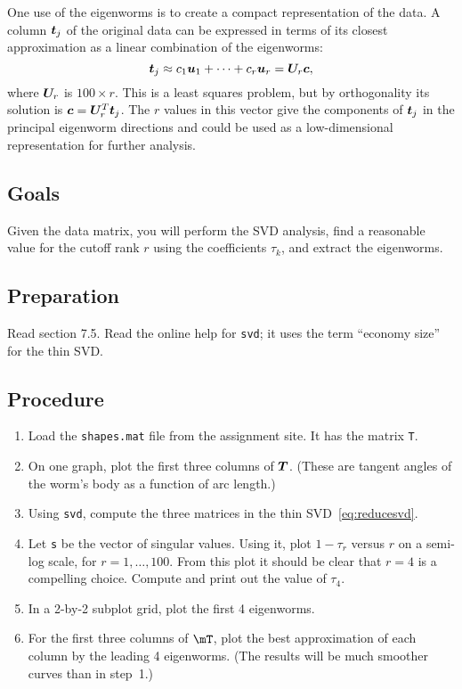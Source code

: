 \documentclass[11pt,twoside]{article}
\begin{document}
One use of the eigenworms is to create a compact representation of the data. A column $\bm{t}_j$ of the original data can be expressed in terms of its closest approximation as a linear combination of the eigenworms:
\[
  \bm{t}_j \approx c_1 \bm{u}_1  + \cdots + c_r \bm{u}_r = \bm{U}_r \bm{c},
\]
where $\bm{U}_r$ is $100\times r$. This is a least squares problem, but by orthogonality its solution is $\bm{c}=\bm{U}_r^T\bm{t}_j$. The $r$ values in this vector give the components of $\bm{t}_j$ in the principal eigenworm directions and could be used as a low-dimensional representation for further analysis.  

\subsection*{Goals}

Given the data matrix, you will perform the SVD analysis, find a reasonable value for the cutoff rank $r$ using the coefficients $\tau_k$, and extract the eigenworms. 

\subsection*{Preparation}

Read section 7.5. Read the online help for \texttt{svd}; it uses the term ``economy size'' for the thin SVD. 

\subsection*{Procedure}

\begin{enumerate}
\item Load the \texttt{shapes.mat} file from the assignment site. It has the matrix \texttt{T}. 

\item On one graph, plot the first three columns of $\bm{T}$. (These are tangent angles of the worm's body as a function of arc length.) 

\item Using \texttt{svd}, compute the three matrices in the thin SVD~\eqref{eq:reducesvd}.

\item Let \texttt{s} be the vector of singular values. Using it, plot $1-\tau_r$ versus $r$ on a semi-log scale, for $r=1,\dots,100$. From this plot it should be clear that $r=4$ is a compelling choice. Compute and print out the value of $\tau_4$.
  
\item In a 2-by-2 subplot grid, plot the first 4 eigenworms.

\item For the first three columns of $\mT$, plot the best approximation of each column by the leading 4 eigenworms. (The results will be much smoother curves than in step~1.) 
\end{enumerate}
\end{document}
